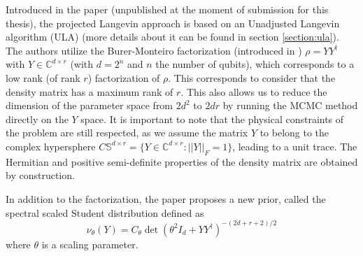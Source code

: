 \documentclass[12pt]{memoir}
\begin{document}
Introduced in the \cite{meth:bayesian:Langevin:ACMT2024} paper (unpublished at the moment of submission for this thesis), the projected Langevin approach is based on an Unadjusted Langevin algorithm (ULA) (more details about it can be found in section \ref{section:ula}). The authors utilize the Burer-Monteiro factorization (introduced in \cite{proj-langevin:Burer2003}) $\rho = Y Y^\dagger$ with $Y \in \mathbb{C}^{d \times r}$ (with $d=2^n$ and $n$ the number of qubits), which corresponds to a low rank (of rank $r$) factorization of $\rho$. This corresponds to consider that the density matrix has a maximum rank of $r$. This also allows us to reduce the dimension of the parameter space from $2d^2$ to $2dr$ by running the MCMC method directly on the $Y$ space. It is important to note that the physical constraints of the problem are still respected, as we assume the matrix $Y$ to belong to the complex hypersphere $C \mathbb{S}^{d\times r} = \{ Y \in \mathbb{C}^{d\times r}: ||Y||_F = 1\}$, leading to a unit trace. The Hermitian and positive semi-definite properties of the density matrix are obtained by construction.\medbreak

In addition to the factorization, the paper proposes a new prior, called the spectral scaled Student distribution defined as
\begin{equation}    
\nu_{\theta} (Y) = C_\theta \det(\theta^2I_d + YY^\dagger)^{-(2d+r+2)/2}
\end{equation}
where $\theta$ is a scaling parameter.\medbreak
\end{document}
